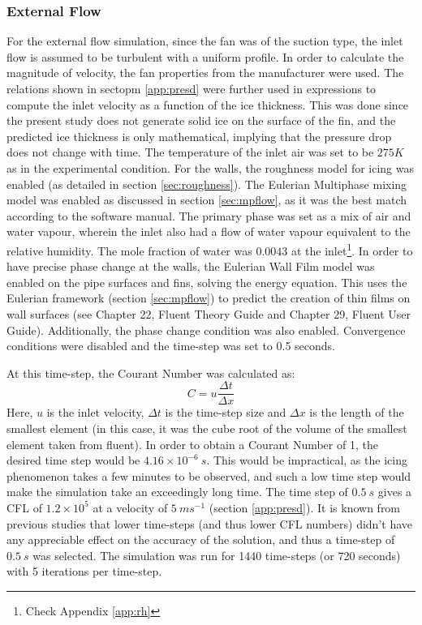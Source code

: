 \documentclass[11pt,a4paper,twoside,oneside]{article}
\begin{document}
\subsubsection{External Flow}\label{sec:externalsolv}
\vspace{0.3cm}
For the external flow simulation, since the fan was of the suction type, the inlet flow is assumed to {be turbulent with a uniform profile}.  In order to calculate the magnitude of velocity, the fan {properties} from the manufacturer were used. The relations shown in sectopm \ref{app:presd} were further used in expressions to compute the inlet velocity as a function of the ice thickness. This was done since the present study does not generate solid ice on the surface of the fin, and the predicted ice thickness is only mathematical, implying that the pressure drop does not change with time. The temperature of the inlet air was set to be $275K$ as in the experimental condition. For the walls, the roughness model for icing was enabled (as detailed in section \ref{sec:roughness}). The Eulerian Multiphase mixing model was enabled as discussed in section \ref{sec:mpflow}, as it was the best match according to the software manual\cite{flug}. The primary phase was set as a mix of air and water vapour, wherein the inlet also had a flow of water vapour equivalent to the relative humidity. The mole fraction of water was $0.0043$ at the inlet\footnote{Check Appendix \ref{app:rh}}. In order to have precise phase change at the walls, the Eulerian Wall Film model was enabled on the pipe surfaces and fins, solving the energy equation. This uses the Eulerian framework (section \ref{sec:mpflow}) to predict the creation of thin films on wall surfaces (see Chapter 22, Fluent Theory Guide\cite{fluth} and Chapter 29, Fluent User Guide\cite{flug}). Additionally, the phase change condition was also enabled. Convergence conditions were disabled and the time-step was set to 0.5 seconds. 

At this time-step, the Courant Number was calculated as\cite{cfl}:$$C=u\frac{\Delta t}{\Delta x}$$
Here, $u$ is the inlet velocity, $\Delta t$ is the time-step size and $\Delta x$ is the length of the smallest element (in this case, it was the cube root of the volume of the smallest element taken from fluent). In order to obtain a Courant Number of 1, the desired time step would be $4.16\times10^{-6}\ s$. This would be impractical, as the icing phenomenon takes a few minutes to be observed, and such a low time step would make the simulation take an exceedingly long time. The time step of $0.5\ s$ gives a CFL of $1.2\times10^5$ at a velocity of $5\ ms^{-1}$ (section \ref{app:presd}). It is known from previous studies that lower time-steps (and thus lower CFL numbers) didn't have any appreciable effect on the accuracy\cite{Afra} of the solution, and thus a time-step of $0.5\ s$ was selected. The simulation was run for 1440 time-steps (or 720 seconds) with 5 iterations per time-step.
\end{document}
